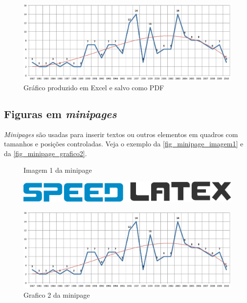     \begin{figure}[htb]
    	\caption{\label{fig_grafico}Gráfico produzido em Excel e salvo como PDF}
    	\begin{center}
    	    \includegraphics[scale=0.5]{assets/grafico.pdf}
    	\end{center}
    \end{figure}

    \subsection{Figuras em \emph{minipages}}

    \emph{Minipages} são usadas para inserir textos ou outros elementos em quadros
    com tamanhos e posições controladas. Veja o exemplo da
    \autoref{fig_minipage_imagem1} e da \autoref{fig_minipage_grafico2}.

    \begin{figure}[htb]
     \label{teste}
     \centering
      \begin{minipage}{0.4\textwidth}
        \centering
        \caption{Imagem 1 da minipage} \label{fig_minipage_imagem1}
        \includegraphics[scale=0.9]{assets/logo.eps}
      \end{minipage}
      \hfill
      \begin{minipage}{0.4\textwidth}
        \centering
        \caption{Grafico 2 da minipage} \label{fig_minipage_grafico2}
        \includegraphics[scale=0.2]{assets/grafico.pdf}
      \end{minipage}
    \end{figure}

